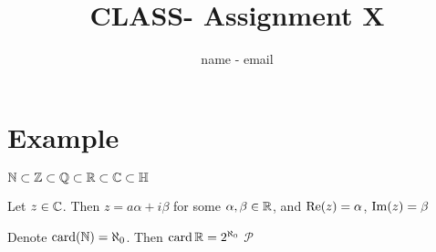 \documentclass[12pt]{article}
\title{CLASS- Assignment X} %
\author{name - email}
\begin{document}
\maketitle

\section*{Example}

\begin{theorem}{1}
$\mathbb{N} \subset \mathbb{Z} \subset \mathbb{Q} \subset \mathbb{R} \subset \mathbb{C} \subset \mathbb{H}$
\end{theorem}

\begin{exercise}{2}
    Let $z \in \mathbb{C}$. Then $z = a\alpha + i\beta$ for some $\alpha, \beta \in \mathbb{R}$, 
    and $\operatorname{Re}(z) = \alpha$, $\operatorname{Im}(z) = \beta$
\end{exercise}

\begin{lemma}{3}
    Denote $\operatorname{card}(\mathbb{N})  = \aleph_0$. Then $\operatorname{card} \mathbb{R} = 2^{\aleph_0}$
    $\mathscr{P}$
\end{lemma}
\end{document}
